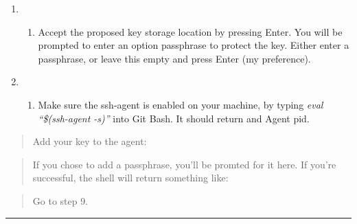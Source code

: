 \documentclass[12pt,]{article}
\providecommand{\tightlist}{%
  \setlength{\itemsep}{0pt}\setlength{\parskip}{0pt}}
\begin{document}
\begin{quote}
\colorbox{light-gray}{}
\end{quote}

\begin{enumerate}
\def\labelenumi{\arabic{enumi}.}
\setcounter{enumi}{6}
\item
  \begin{enumerate}
  \def\labelenumii{\alph{enumii}.}
  \setcounter{enumii}{1}
  \tightlist
  \item
    Accept the proposed key storage location by pressing Enter. You will
    be prompted to enter an option passphrase to protect the key. Either
    enter a passphrase, or leave this empty and press Enter (my
    preference).
  \end{enumerate}
\item
  \begin{enumerate}
  \def\labelenumii{\alph{enumii}.}
  \setcounter{enumii}{1}
  \tightlist
  \item
    Make sure the ssh-agent is enabled on your machine, by typing
    \emph{eval ``\$(ssh-agent -s)''} into Git Bash. It should return and
    Agent pid.
  \end{enumerate}
\end{enumerate}

\begin{quote}
Add your key to the agent:
\end{quote}

\begin{quote}
\colorbox{light-gray}{}
\end{quote}

\begin{quote}
If you chose to add a passphrase, you'll be promted for it here. If
you're successful, the shell will return something like:
\end{quote}

\begin{quote}
\colorbox{light-gray}{}
\end{quote}

\begin{quote}
Go to step 9.
\end{quote}

\begin{center}\rule{0.5\linewidth}{\linethickness}\end{center}
\end{document}
